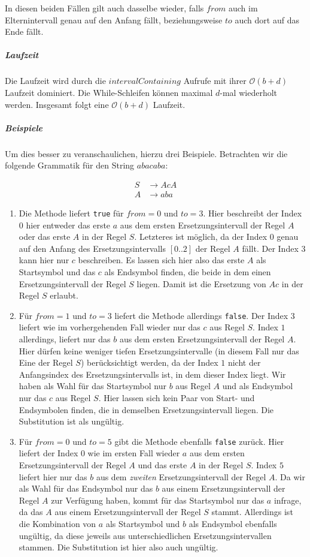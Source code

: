 In diesen beiden Fällen gilt auch dasselbe wieder, falls $from$ auch im Elternintervall genau auf den Anfang fällt, beziehungsweise $to$ auch dort auf das Ende fällt.

\subparagraph{Laufzeit} 
Die Laufzeit wird durch die $intervalContaining$ Aufrufe mit ihrer $\mathcal{O}(b + d)$ Laufzeit dominiert. Die While-Schleifen können maximal $d$-mal wiederholt werden. Insgesamt folgt eine $\mathcal{O}(b + d)$ Laufzeit. 

\subparagraph{Beispiele}
Um dies besser zu veranschaulichen, hierzu drei Beispiele. Betrachten wir die folgende Grammatik für den String $abacaba$:

\begin{align*}
    S &\rightarrow AcA\\
    A &\rightarrow aba
\end{align*}
\begin{enumerate}
    \item Die Methode liefert \texttt{true} für $from=0$ und $to=3$. Hier beschreibt der Index $0$ hier entweder das erste $a$ aus dem ersten Ersetzungsintervall der Regel $A$ oder das erste $A$ in der Regel $S$. Letzteres ist möglich, da der Index $0$ genau auf den Anfang des Ersetzungsintervalls $[0..2]$ der Regel $A$ fällt. Der Index $3$ kann hier nur $c$ beschreiben.
    Es lassen sich hier also das erste $A$ als Startsymbol und das $c$ als Endsymbol finden, die beide in dem einen Ersetzungsintervall der Regel $S$ liegen. Damit ist die Ersetzung von $Ac$ in der Regel $S$ erlaubt.
    \item Für $from=1$ und $to=3$ liefert die Methode allerdings \texttt{false}. Der Index $3$ liefert wie im vorhergehenden Fall wieder nur das $c$ aus Regel $S$.
    Index $1$ allerdings, liefert nur das $b$ aus dem ersten Ersetzungsintervall der Regel $A$. Hier dürfen keine weniger tiefen Ersetzungsintervalle (in diesem Fall nur das Eine der Regel $S$) berücksichtigt werden, da der Index $1$ nicht der Anfangsindex des Ersetzungsintervalls ist, in dem dieser Index liegt.
    Wir haben als Wahl für das Startsymbol nur $b$ aus Regel $A$ und als Endsymbol nur das $c$ aus Regel $S$. Hier lassen sich kein Paar von Start- und Endsymbolen finden, die in demselben Ersetzungsintervall liegen. Die Substitution ist als ungültig.
    \item Für $from=0$ und $to=5$ gibt die Methode ebenfalls \texttt{false} zurück. Hier liefert der Index $0$ wie im ersten Fall wieder $a$ aus dem ersten Ersetzungsintervall der Regel $A$ und das erste $A$ in der Regel $S$. Index $5$ liefert hier nur das $b$ aus dem \emph{zweiten} Ersetzungsintervall der Regel $A$. 
    Da wir als Wahl für das Endsymbol nur das $b$ aus einem Ersetzungsintervall der Regel $A$ zur Verfügung haben, kommt für das Startsymbol nur das $a$ infrage, da das $A$ aus einem Ersetzungsintervall der Regel $S$ stammt.
    Allerdings ist die Kombination von $a$ als Startsymbol und $b$ als Endsymbol ebenfalls ungültig, da diese jeweils aus unterschiedlichen Ersetzungsintervallen stammen.
    Die Substitution ist hier also auch ungültig.
\end{enumerate}

